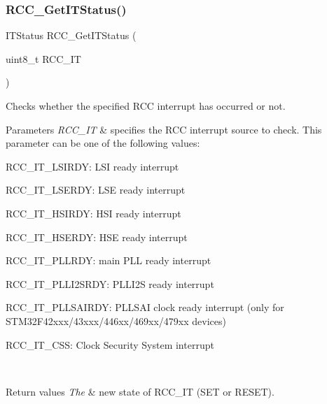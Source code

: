 \subsubsection{\texorpdfstring{R\+C\+C\+\_\+\+Get\+I\+T\+Status()}{RCC\_GetITStatus()}}
{\footnotesize\ttfamily I\+T\+Status R\+C\+C\+\_\+\+Get\+I\+T\+Status (\begin{DoxyParamCaption}\item[{uint8\+\_\+t}]{R\+C\+C\+\_\+\+IT }\end{DoxyParamCaption})}



Checks whether the specified R\+CC interrupt has occurred or not. 


\begin{DoxyParams}{Parameters}
{\em R\+C\+C\+\_\+\+IT} & specifies the R\+CC interrupt source to check. This parameter can be one of the following values\+: \begin{DoxyItemize}
\item R\+C\+C\+\_\+\+I\+T\+\_\+\+L\+S\+I\+R\+DY\+: L\+SI ready interrupt \item R\+C\+C\+\_\+\+I\+T\+\_\+\+L\+S\+E\+R\+DY\+: L\+SE ready interrupt \item R\+C\+C\+\_\+\+I\+T\+\_\+\+H\+S\+I\+R\+DY\+: H\+SI ready interrupt \item R\+C\+C\+\_\+\+I\+T\+\_\+\+H\+S\+E\+R\+DY\+: H\+SE ready interrupt \item R\+C\+C\+\_\+\+I\+T\+\_\+\+P\+L\+L\+R\+DY\+: main P\+LL ready interrupt \item R\+C\+C\+\_\+\+I\+T\+\_\+\+P\+L\+L\+I2\+S\+R\+DY\+: P\+L\+L\+I2S ready interrupt \item R\+C\+C\+\_\+\+I\+T\+\_\+\+P\+L\+L\+S\+A\+I\+R\+DY\+: P\+L\+L\+S\+AI clock ready interrupt (only for S\+T\+M32\+F42xxx/43xxx/446xx/469xx/479xx devices) \item R\+C\+C\+\_\+\+I\+T\+\_\+\+C\+SS\+: Clock Security System interrupt \end{DoxyItemize}
\\
\hline
\end{DoxyParams}

\begin{DoxyRetVals}{Return values}
{\em The} & new state of R\+C\+C\+\_\+\+IT (S\+ET or R\+E\+S\+ET). \\
\hline
\end{DoxyRetVals}
\mbox{\label{group___r_c_c_gaaeb32311c208b2a980841c9c884a41ea}} 
